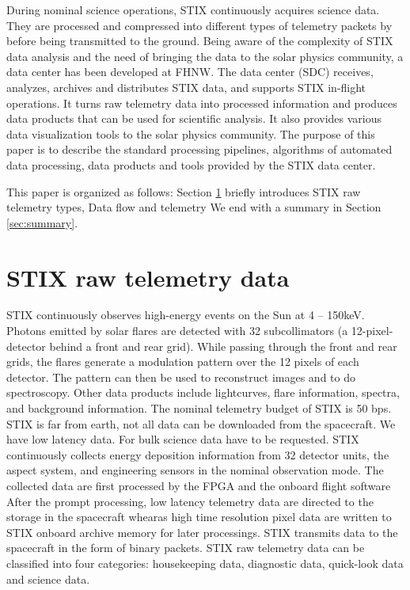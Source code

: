 \documentclass{aa}
\begin{document}
During nominal science operations, STIX continuously acquires science data. 
They are processed and compressed into different types of telemetry packets by
before being transmitted to the ground.
Being aware of the complexity of STIX data analysis and 
the need of bringing the data to the solar physics community, a data center has been
developed at FHNW. The data center (SDC) receives, analyzes, archives and distributes STIX data,
 and supports STIX in-flight operations.
It turns raw telemetry data into processed information and produces data products that can be used for scientific analysis.
It also provides various data visualization tools to the solar physics community.
The purpose of this paper is to describe the standard processing pipelines, 
algorithms of automated data processing, data products and tools provided by the STIX data center.

This paper is organized as follows: Section \ref{sec:raw-data} briefly introduces STIX raw telemetry types, Data flow and telemetry
We end with a summary in Section \ref{sec:summary}.
\section{STIX raw telemetry data}
\label{sec:raw-data}

STIX continuously observes high-energy events on the Sun at 4 -- 150keV. 
Photons emitted by solar flares are detected with 32 subcollimators 
(a 12-pixel-detector behind a front and rear grid). While passing through the front and rear grids, 
the flares generate a modulation pattern over the 12 pixels of each detector. 
The pattern can then be used to reconstruct images and to do spectroscopy. 
Other data products include lightcurves, flare information, spectra, and background information.
The nominal telemetry budget of STIX is 50 bps.
STIX is far from earth, not all data can be downloaded from the spacecraft. We have low latency data.
For bulk science data have to be requested.
STIX continuously collects energy deposition information from 32 detector units, the aspect system,
and engineering sensors in the nominal observation mode.
The collected data are first processed by the FPGA and the onboard flight software
After the prompt processing, low latency telemetry data are directed to the
storage in the spacecraft whearas high time resolution pixel data are written to STIX onboard archive memory for
later processings.
STIX transmits data to the spacecraft in the form of binary packets.
STIX raw telemetry data can be classified into four
categories: housekeeping data, diagnostic data, quick-look data and science data.
\end{document}
